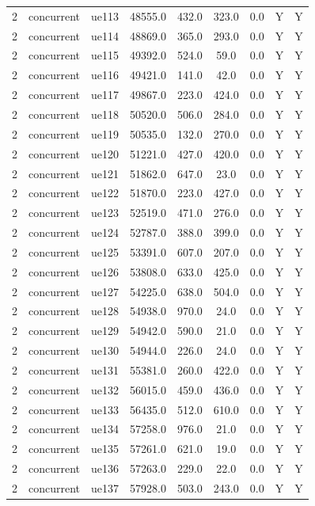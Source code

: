 \begin{table}[ht]
\begin{tabular}{|c|c|c|c|c|c|c|c|c|}
2 & concurrent & ue113 & 48555.0 & 432.0 & 323.0 & 0.0 & Y & Y \\
2 & concurrent & ue114 & 48869.0 & 365.0 & 293.0 & 0.0 & Y & Y \\
2 & concurrent & ue115 & 49392.0 & 524.0 & 59.0 & 0.0 & Y & Y \\
2 & concurrent & ue116 & 49421.0 & 141.0 & 42.0 & 0.0 & Y & Y \\
2 & concurrent & ue117 & 49867.0 & 223.0 & 424.0 & 0.0 & Y & Y \\
2 & concurrent & ue118 & 50520.0 & 506.0 & 284.0 & 0.0 & Y & Y \\
2 & concurrent & ue119 & 50535.0 & 132.0 & 270.0 & 0.0 & Y & Y \\
2 & concurrent & ue120 & 51221.0 & 427.0 & 420.0 & 0.0 & Y & Y \\
2 & concurrent & ue121 & 51862.0 & 647.0 & 23.0 & 0.0 & Y & Y \\
2 & concurrent & ue122 & 51870.0 & 223.0 & 427.0 & 0.0 & Y & Y \\
2 & concurrent & ue123 & 52519.0 & 471.0 & 276.0 & 0.0 & Y & Y \\
2 & concurrent & ue124 & 52787.0 & 388.0 & 399.0 & 0.0 & Y & Y \\
2 & concurrent & ue125 & 53391.0 & 607.0 & 207.0 & 0.0 & Y & Y \\
2 & concurrent & ue126 & 53808.0 & 633.0 & 425.0 & 0.0 & Y & Y \\
2 & concurrent & ue127 & 54225.0 & 638.0 & 504.0 & 0.0 & Y & Y \\
2 & concurrent & ue128 & 54938.0 & 970.0 & 24.0 & 0.0 & Y & Y \\
2 & concurrent & ue129 & 54942.0 & 590.0 & 21.0 & 0.0 & Y & Y \\
2 & concurrent & ue130 & 54944.0 & 226.0 & 24.0 & 0.0 & Y & Y \\
2 & concurrent & ue131 & 55381.0 & 260.0 & 422.0 & 0.0 & Y & Y \\
2 & concurrent & ue132 & 56015.0 & 459.0 & 436.0 & 0.0 & Y & Y \\
2 & concurrent & ue133 & 56435.0 & 512.0 & 610.0 & 0.0 & Y & Y \\
2 & concurrent & ue134 & 57258.0 & 976.0 & 21.0 & 0.0 & Y & Y \\
2 & concurrent & ue135 & 57261.0 & 621.0 & 19.0 & 0.0 & Y & Y \\
2 & concurrent & ue136 & 57263.0 & 229.0 & 22.0 & 0.0 & Y & Y \\
2 & concurrent & ue137 & 57928.0 & 503.0 & 243.0 & 0.0 & Y & Y \\

\end{tabular}
\end{table}
